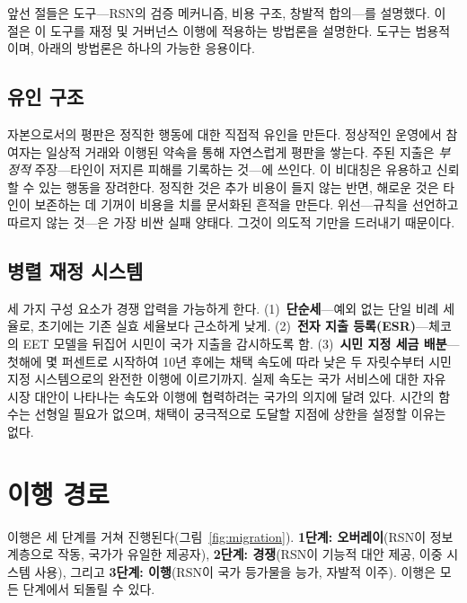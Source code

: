 \documentclass[11pt,a4paper,twocolumn]{article}
\begin{document}
앞선 절들은 도구---RSN의 검증 메커니즘, 비용 구조, 창발적 합의---를 설명했다. 이 절은 이 도구를 재정 및 거버넌스 이행에 적용하는 방법론을 설명한다. 도구는 범용적이며, 아래의 방법론은 하나의 가능한 응용이다.

\subsection{유인 구조}

자본으로서의 평판은 정직한 행동에 대한 직접적 유인을 만든다. 정상적인 운영에서 참여자는 일상적 거래와 이행된 약속을 통해 자연스럽게 평판을 쌓는다. 주된 지출은 \emph{부정적} 주장---타인이 저지른 피해를 기록하는 것---에 쓰인다. 이 비대칭은 유용하고 신뢰할 수 있는 행동을 장려한다. 정직한 것은 추가 비용이 들지 않는 반면, 해로운 것은 타인이 보존하는 데 기꺼이 비용을 치를 문서화된 흔적을 만든다. 위선---규칙을 선언하고 따르지 않는 것---은 가장 비싼 실패 양태다. 그것이 의도적 기만을 드러내기 때문이다.

\subsection{병렬 재정 시스템}

세 가지 구성 요소가 경쟁 압력을 가능하게 한다. (1)~\textbf{단순세}---예외 없는 단일 비례 세율로, 초기에는 기존 실효 세율보다 근소하게 낮게. (2)~\textbf{전자 지출 등록(ESR)}---체코의 EET 모델을 뒤집어 시민이 국가 지출을 감시하도록 함. (3)~\textbf{시민 지정 세금 배분}---첫해에 몇 퍼센트로 시작하여 10년 후에는 채택 속도에 따라 낮은 두 자릿수부터 시민 지정 시스템으로의 완전한 이행에 이르기까지. 실제 속도는 국가 서비스에 대한 자유 시장 대안이 나타나는 속도와 이행에 협력하려는 국가의 의지에 달려 있다. 시간의 함수는 선형일 필요가 없으며, 채택이 궁극적으로 도달할 지점에 상한을 설정할 이유는 없다.

\section{이행 경로}

이행은 세 단계를 거쳐 진행된다(그림~\ref{fig:migration}). \textbf{1단계: 오버레이}(RSN이 정보 계층으로 작동, 국가가 유일한 제공자), \textbf{2단계: 경쟁}(RSN이 기능적 대안 제공, 이중 시스템 사용), 그리고 \textbf{3단계: 이행}(RSN이 국가 등가물을 능가, 자발적 이주). 이행은 모든 단계에서 되돌릴 수 있다.
\end{document}
